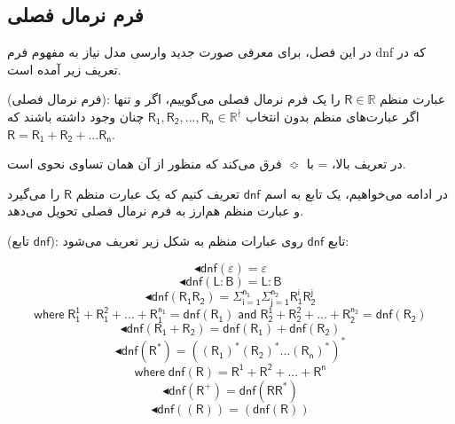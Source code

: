 \subsection{فرم نرمال فصلی}

	 در این فصل، برای معرفی صورت جدید وارسی مدل نیاز به مفهوم فرم \gls{dnf} که در تعریف زیر آمده است.
	 \begin{defn}
	 	(فرم نرمال فصلی): عبارت منظم 
	 	$\mathsf{R} \in \mathbb{R}$
	 	را یک فرم نرمال فصلی می‌گوییم، اگر و تنها اگر عبارت‌های منظم بدون انتخاب
	 	$\mathsf{R_1 , R_2, ..., R_n} \in \mathbb{R}^{\nmid}$
	 	چنان وجود داشته باشند که 
	 	$\mathsf{R= R_1 + R_2 + ... R_n}$.
	 \end{defn}
 در تعریف بالا، = با 
 $\Bumpeq$
فرق می‌کند که منظور از آن همان تساوی نحوی است.
 
 در ادامه می‌خواهیم، یک تابع به اسم $\mathsf{dnf}$ تعریف کنیم که یک عبارت منظم $\mathsf{R}$ را می‌گیرد و عبارت منظم هم‌ارز به فرم نرمال فصلی تحویل می‌دهد.
 
  
  \begin{defn}
  	(تابع $\mathsf{dnf}$): تابع $\mathsf{dnf}$ روی عبارات منظم به شکل زیر تعریف می‌شود:
  	
  	$$\blacktriangleleft\mathsf{dnf}(\varepsilon)=\varepsilon$$
  	$$\blacktriangleleft\mathsf{dnf}(\mathsf{L:B})=\mathsf{L:B}$$
  	$$\blacktriangleleft\mathsf{dnf}(\mathsf{R_1 R_2})= \mathsf{\Sigma_{i=1}^{n_1} \Sigma_{j=1}^{n_2} R_1^i R_2^j }$$
  	$$\mathsf{where\;R_1^1 + R_1^2 + ... + R_1^{n_1} = dnf(R_1)\;and\; R_2^1 + R_2^2 + ... + R_2^{n_2}= dnf(R_2)}$$
   $$\blacktriangleleft\mathsf{dnf (R_1+R_2)=dnf(R_1)+dnf(R_2)}$$
   $$\blacktriangleleft\mathsf{dnf (R^*)}= \mathsf{((R_1)^* (R_2)^* ... (R_n)^*)^*}$$
   $$\mathsf{where\;dnf(R)=R^1+R^2+...+R^n}$$
   $$\blacktriangleleft\mathsf{dnf(R^+)=dnf(RR^*)}$$
   $$\blacktriangleleft\mathsf{ dnf((R)) = ( dnf(R) ) }$$  
   	
  \end{defn}

